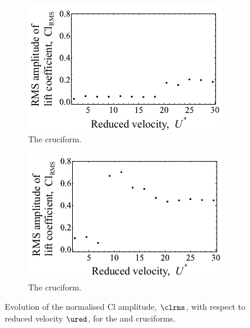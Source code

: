 \documentclass[a4paper,fleqn]{cas-sc}
\begin{document}
\begin{figure}
  \centering
  \begin{subfigure}[h]{0.4\textwidth}
    \includegraphics[width=\textwidth]{figs/clRMS2}
    \caption{The \angtw{} cruciform.}
    \label{fig:clRMS2}
  \end{subfigure}
  \hspace{6mm}
  \begin{subfigure}[h]{0.4\textwidth}
    \includegraphics[width=\textwidth]{figs/clRMS1}
    \caption{The \angon{} cruciform.}
    \label{fig:clRMS1}
  \end{subfigure}

  \label{fig:clRMS21}
  \caption{Evolution of the normalised Cl \rms{} amplitude, $\clrms$, with respect to reduced velocity $\ured$, for the \angtw{} and \angon{} cruciforms.}
\end{figure}
\end{document}
